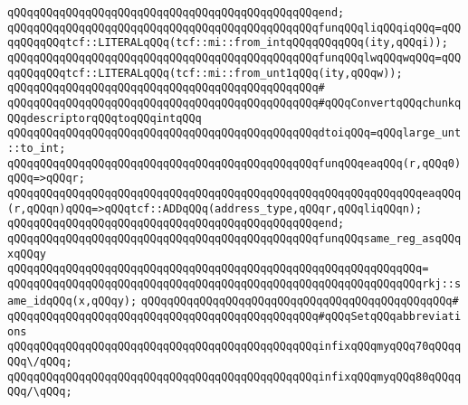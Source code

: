 \verb|qQQqqQQqqQQqqQQqqQQqqQQqqQQqqQQqqQQqqQQqqQQqqQQqend;|\newline
\newline
\verb|qQQqqQQqqQQqqQQqqQQqqQQqqQQqqQQqqQQqqQQqqQQqqQQqfunqQQqliqQQqiqQQq=qQQqqQQqqQQqtcf::LITERALqQQq(tcf::mi::from_intqQQqqQQqqQQq(ity,qQQqi));|\newline
\verb|qQQqqQQqqQQqqQQqqQQqqQQqqQQqqQQqqQQqqQQqqQQqqQQqfunqQQqlwqQQqwqQQq=qQQqqQQqqQQqtcf::LITERALqQQq(tcf::mi::from_unt1qQQq(ity,qQQqw));|\newline
\newline
\verb|qQQqqQQqqQQqqQQqqQQqqQQqqQQqqQQqqQQqqQQqqQQqqQQq#|\newline
\verb|qQQqqQQqqQQqqQQqqQQqqQQqqQQqqQQqqQQqqQQqqQQqqQQq#qQQqConvertqQQqchunkqQQqdescriptorqQQqtoqQQqintqQQq|\newline
\newline
\verb|qQQqqQQqqQQqqQQqqQQqqQQqqQQqqQQqqQQqqQQqqQQqqQQqdtoiqQQq=qQQqlarge_unt::to_int;|\newline
\newline
\newline
\verb|qQQqqQQqqQQqqQQqqQQqqQQqqQQqqQQqqQQqqQQqqQQqqQQqfunqQQqeaqQQq(r,qQQq0)qQQq=>qQQqr;|\newline
\verb|qQQqqQQqqQQqqQQqqQQqqQQqqQQqqQQqqQQqqQQqqQQqqQQqqQQqqQQqqQQqqQQqeaqQQq(r,qQQqn)qQQq=>qQQqtcf::ADDqQQq(address_type,qQQqr,qQQqliqQQqn);|\newline
\verb|qQQqqQQqqQQqqQQqqQQqqQQqqQQqqQQqqQQqqQQqqQQqqQQqend;|\newline
\newline
\verb|qQQqqQQqqQQqqQQqqQQqqQQqqQQqqQQqqQQqqQQqqQQqqQQqfunqQQqsame_reg_asqQQqxqQQqy|\newline
\verb|qQQqqQQqqQQqqQQqqQQqqQQqqQQqqQQqqQQqqQQqqQQqqQQqqQQqqQQqqQQqqQQq=|\newline
\verb|qQQqqQQqqQQqqQQqqQQqqQQqqQQqqQQqqQQqqQQqqQQqqQQqqQQqqQQqqQQqqQQqrkj::same_idqQQq(x,qQQqy);|\newline
\newline
\newline
\verb|qQQqqQQqqQQqqQQqqQQqqQQqqQQqqQQqqQQqqQQqqQQqqQQq#|\newline
\verb|qQQqqQQqqQQqqQQqqQQqqQQqqQQqqQQqqQQqqQQqqQQqqQQq#qQQqSetqQQqabbreviations|\newline
\newline
\verb|qQQqqQQqqQQqqQQqqQQqqQQqqQQqqQQqqQQqqQQqqQQqqQQqinfixqQQqmyqQQq70qQQqqQQq\/qQQq;|\newline
\verb|qQQqqQQqqQQqqQQqqQQqqQQqqQQqqQQqqQQqqQQqqQQqqQQqinfixqQQqmyqQQq80qQQqqQQq/\qQQq;|\newline
